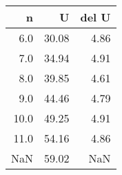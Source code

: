 \begin{tabular}{rrr}
\toprule
   n &     U &  del U \\
\midrule
 6.0 & 30.08 &   4.86 \\
 7.0 & 34.94 &   4.91 \\
 8.0 & 39.85 &   4.61 \\
 9.0 & 44.46 &   4.79 \\
10.0 & 49.25 &   4.91 \\
11.0 & 54.16 &   4.86 \\
 NaN & 59.02 &    NaN \\
\bottomrule
\end{tabular}
